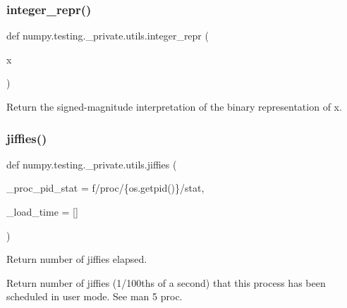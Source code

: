 \subsubsection{\texorpdfstring{integer\+\_\+repr()}{integer\_repr()}}
{\footnotesize\ttfamily def numpy.\+testing.\+\_\+private.\+utils.\+integer\+\_\+repr (\begin{DoxyParamCaption}\item[{}]{x }\end{DoxyParamCaption})}

\begin{DoxyVerb}Return the signed-magnitude interpretation of the binary representation
of x.\end{DoxyVerb}
 \mbox{\label{namespacenumpy_1_1testing_1_1__private_1_1utils_a2402f5aaa73b77dd2113320cac0ffb4e}} 
\subsubsection{\texorpdfstring{jiffies()}{jiffies()}\hspace{0.1cm}{\footnotesize\ttfamily [1/2]}}
{\footnotesize\ttfamily def numpy.\+testing.\+\_\+private.\+utils.\+jiffies (\begin{DoxyParamCaption}\item[{}]{\+\_\+proc\+\_\+pid\+\_\+stat = {\ttfamily f\textquotesingle{}/proc/\{os.getpid()\}/stat\textquotesingle{}},  }\item[{}]{\+\_\+load\+\_\+time = {\ttfamily \mbox{[}\mbox{]}} }\end{DoxyParamCaption})}

\begin{DoxyVerb}Return number of jiffies elapsed.

Return number of jiffies (1/100ths of a second) that this
process has been scheduled in user mode. See man 5 proc.\end{DoxyVerb}
 \mbox{\label{namespacenumpy_1_1testing_1_1__private_1_1utils_aeb462e79e70ba8f234721759fdac346a}} 
